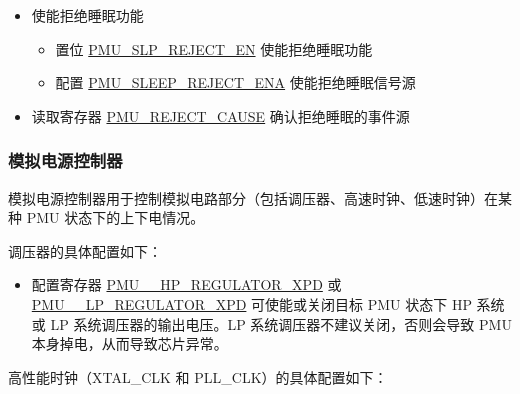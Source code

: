 \documentclass[main\_\_CN.tex]{subfiles}
\begin{document}
\begin{itemize}
    \item  使能拒绝睡眠功能
        \begin{itemize}
            \item 置位 \hyperref[fielddesc:PMUSLPREJECTEN]{PMU\_SLP\_REJECT\_EN} 使能拒绝睡眠功能
            \item 配置 \hyperref[fielddesc:PMUSLEEPREJECTENA]{PMU\_SLEEP\_REJECT\_ENA} 使能拒绝睡眠信号源
        \end{itemize}
    \item 读取寄存器 \hyperref[fielddesc:PMUREJECTCAUSE]{PMU\_REJECT\_CAUSE} 确认拒绝睡眠的事件源
\end{itemize}

\subsubsection{模拟电源控制器}\label{sec:pmu_analog_power_controller}

模拟电源控制器用于控制模拟电路部分（包括调压器、高速时钟、低速时钟）在某种 PMU 状态下的上下电情况。

调压器的具体配置如下：

\begin{itemize}
    \item 配置寄存器 \hyperref[fielddesc:PMUHPACTIVEHPREGULATORXPD]{PMU\_\_HP\_REGULATOR\_XPD} 或 \hyperref[fielddesc:PMUHPSLEEPLPREGULATORXPD]{PMU\_\_LP\_REGULATOR\_XPD} 可使能或关闭目标 PMU 状态下 HP 系统或 LP 系统调压器的输出电压。LP 系统调压器不建议关闭，否则会导致 PMU 本身掉电，从而导致芯片异常。
\end{itemize}

高性能时钟（XTAL\_CLK 和 PLL\_CLK）的具体配置如下：
\end{document}
